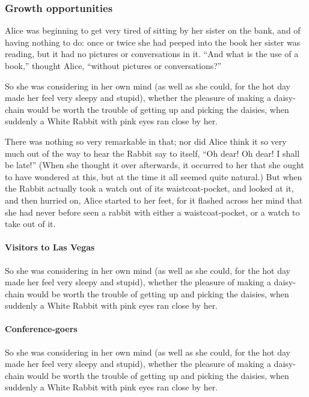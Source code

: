 \documentclass[12pt]{article}
\begin{document}
\subsubsection{Growth opportunities}
\label{sec-4-7-1}
Alice was beginning to get very tired of sitting by her sister on the bank, and of having nothing to do: once or twice she had peeped into the book her sister was reading, but it had no pictures or conversations in it. ``And what is the use of a book,'' thought Alice, ``without pictures or conversations?'' 

So she was considering in her own mind (as well as she could, for the hot day made her feel very sleepy and stupid), whether the pleasure of making a daisy-chain would be worth the trouble of getting up and picking the daisies, when suddenly a White Rabbit with pink eyes ran close by her.

There was nothing so very remarkable in that; nor did Alice think it so very much out of the way to hear the Rabbit say to itself, ``Oh dear! Oh dear! I shall be late!'' (When she thought it over afterwards, it occurred to her that she ought to have wondered at this, but at the time it all seemed quite natural.) But when the Rabbit actually took a watch out of its waistcoat-pocket, and looked at it, and then hurried on, Alice started to her feet, for it flashed across her mind that she had never before seen a rabbit with either a waistcoat-pocket, or a watch to take out of it. 

\paragraph{Visitors to Las Vegas}
\label{sec-4-7-1-1}
So she was considering in her own mind (as well as she could, for the hot day made her feel very sleepy and stupid), whether the pleasure of making a daisy-chain would be worth the trouble of getting up and picking the daisies, when suddenly a White Rabbit with pink eyes ran close by her. 

\paragraph{Conference-goers}
\label{sec-4-7-1-2}
So she was considering in her own mind (as well as she could, for the hot day made her feel very sleepy and stupid), whether the pleasure of making a daisy-chain would be worth the trouble of getting up and picking the daisies, when suddenly a White Rabbit with pink eyes ran close by her. 
\end{document}
